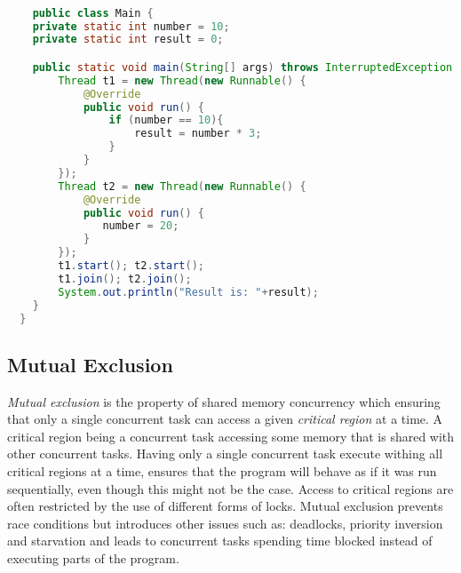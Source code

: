 \begin{lstlisting}[float,label=lst:racecondition,
  caption={Race condition example},
  language=Java,  
  showspaces=false,
  showtabs=false,
  breaklines=true,
  showstringspaces=false,
  breakatwhitespace=true,
  commentstyle=\color{greencomments},
  keywordstyle=\color{bluekeywords},
  stringstyle=\color{redstrings}]  % Start your code-block

	public class Main {
    private static int number = 10;
    private static int result = 0;

    public static void main(String[] args) throws InterruptedException {
        Thread t1 = new Thread(new Runnable() {
            @Override
            public void run() {
                if (number == 10){
                    result = number * 3;
                }
            }
        });
        Thread t2 = new Thread(new Runnable() {
            @Override
            public void run() {
               number = 20;
            }
        });
        t1.start(); t2.start();
        t1.join(); t2.join();
        System.out.println("Result is: "+result);
    }
  }
\end{lstlisting}

\subsection{Mutual Exclusion}
\emph{Mutual exclusion} is the property of shared memory concurrency which ensuring that only a single concurrent task can access a given \emph{critical region} at a time\cite[p. 117]{tanenbaum2008modern}\cite[p. 962]{bryant2011computer}. A critical region being a concurrent task accessing some memory that is shared with other concurrent tasks\cite[p. 117]{tanenbaum2008modern}\cite[p. 961]{bryant2011computer}. Having only a single concurrent task execute withing all critical regions at a time, ensures that the program will behave as if it was run sequentially, even though this might not be the case. Access to critical regions are often restricted by the use of different forms of locks. Mutual exclusion prevents race conditions but introduces other issues such as: deadlocks, priority inversion and starvation and leads to concurrent tasks spending time blocked instead of executing parts of the program.

